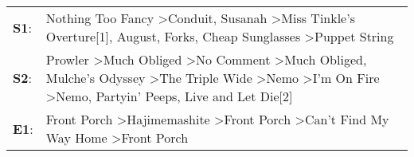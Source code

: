 \begin{supertabular}{p{0.03\textwidth}p{0.92\textwidth}}
 \textbf{S1}:  &                                                                                                                                                                     Nothing Too Fancy\textsuperscript{} \textgreater \enspace Conduit\textsuperscript{}, \enspace Susanah\textsuperscript{} \textgreater \enspace Miss Tinkle's Overture[1]\textsuperscript{}, \enspace August\textsuperscript{}, \enspace Forks\textsuperscript{}, \enspace Cheap Sunglasses\textsuperscript{} \textgreater \enspace Puppet String\textsuperscript{}  \enspace  \\
 \textbf{S2}:  &  Prowler\textsuperscript{} \textgreater \enspace Much Obliged\textsuperscript{} \textgreater \enspace No Comment\textsuperscript{} \textgreater \enspace Much Obliged\textsuperscript{}, \enspace Mulche's Odyssey\textsuperscript{} \textgreater \enspace The Triple Wide\textsuperscript{} \textgreater \enspace Nemo\textsuperscript{} \textgreater \enspace I'm On Fire\textsuperscript{} \textgreater \enspace Nemo\textsuperscript{}, \enspace Partyin' Peeps\textsuperscript{}, \enspace Live and Let Die[2]\textsuperscript{}  \enspace  \\
 \textbf{E1}:  &                                                                                                                                                                                                                                                                            Front Porch\textsuperscript{} \textgreater \enspace Hajimemashite\textsuperscript{} \textgreater \enspace Front Porch\textsuperscript{} \textgreater \enspace Can't Find My Way Home\textsuperscript{} \textgreater \enspace Front Porch\textsuperscript{}  \enspace  \\
\end{supertabular}

